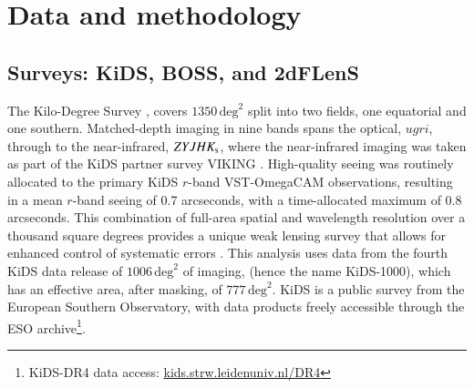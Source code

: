 \section{Data and methodology}
\label{sec:data}

\subsection{Surveys:  KiDS, BOSS, and 2dFLenS}
\label{sec:surveys}

The Kilo-Degree Survey \citep[KiDS,][]{dejong/etal:2013}, covers $1350\,\mathrm{deg}^{2}$ split into two fields, one
equatorial and one southern.    Matched-depth imaging in nine bands spans the optical,
$ugri$, through to the near-infrared, $ZYJHK_{\rm s}$, where the
near-infrared imaging was taken as part of the KiDS partner survey
VIKING \citep[the VISTA Kilo-degree INfrared Galaxy
survey,][]{edge/etal:2013}.  High-quality seeing was
routinely allocated to the primary KiDS $r$-band VST-OmegaCAM observations, resulting in a
mean $r$-band seeing of 0.7 arcseconds, with a time-allocated maximum of 0.8
arcseconds.  This combination of full-area spatial and wavelength
resolution over a thousand square degrees
provides a unique weak lensing survey that allows for enhanced
control of systematic errors \citep{giblin/etal:inprep, hildebrandt/etal:inprep}.
This analysis uses data from the fourth KiDS
data release of $1006\,\mathrm{deg}^{2}$ of imaging, (hence the name KiDS-1000), which has an effective
area, after masking, of $777\,\mathrm{deg}^{2}$.  KiDS is a public survey from the European Southern
Observatory, with data products freely accessible through the ESO
archive\footnote{KiDS-DR4 data access: \href{http://kids.strw.leidenuniv.nl/DR4}{kids.strw.leidenuniv.nl/DR4}}.   

